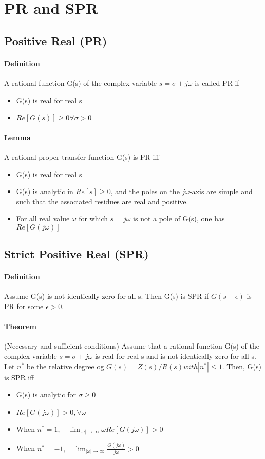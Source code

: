 \section{PR and SPR}
\subsection{Positive Real (PR)}
\paragraph{Definition}
A rational function G(s) of the complex variable $s=\sigma + j\omega$ is called PR if
\begin{itemize}
\item G(s) is real for real s
\item $Re[G(s)] \geq 0 \forall \sigma>0$
\end{itemize}

\paragraph{Lemma}
A rational proper transfer function G(s) is PR iff
\begin{itemize}
\item G(s) is real for real s
\item G(s) is analytic in $Re[s] \geq 0$, and the poles on the $j\omega$-axis are simple and such that the associated residues are real and positive.
\item For all real value $\omega$ for which $s=j\omega$ is not a pole of G(s), one has $Re[G(j\omega)]$
\end{itemize}

\subsection{Strict Positive Real (SPR)}
\paragraph{Definition} Assume G(s) is not identically zero for all s. Then G(s) is SPR if $G(s-\epsilon)$ is PR for some $\epsilon > 0$.

\paragraph{Theorem} (Necessary and sufficient conditions) \newline
Assume that a rational function G(s) of the complex variable $s = \sigma + j\omega$ is real for real s and is not identically zero for all s. Let $n^*$ be the relative degree og $G(s) = Z(s) / R(s) with |n^*| \leq 1$. Then, G(s) is SPR iff
\begin{itemize}
\item G(s) is analytic for $\sigma \geq 0$
\item $Re[G(j\omega)] > 0, \forall \omega$
\item When $n^* = 1, \quad \lim_{|\omega| \to \infty} \omega Re[G(j\omega)] > 0 $
\item When $n^* = -1,\quad \lim_{|\omega| \to \infty} \frac{G(j\omega)}{j\omega} >0 $
\end{itemize}

